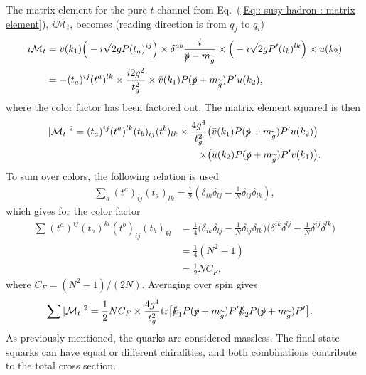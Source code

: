 \documentclass[twoside,english]{uiofysmaster}
\begin{document}
{The matrix element for the pure $t$-channel from Eq.~(\ref{Eq:: susy hadron : matrix element}), $i\mathcal{M}_t$, becomes (reading direction is from $q_j$ to $q_i$)
\begin{align*}
i \mathcal{M}_t &= \bar{v} (k_1) \Big( -i \sqrt{2} g P (t_a)^{ij}\Big) \times \delta^{ab} \frac{i}{\slashed{p} - m_{\widetilde{g}}} \times \Big( -i \sqrt{2} gP'(t_b)^{lk} \Big) \times u(k_2)\\
&= - (t_a)^{ij}(t^a)^{lk} \times \frac{i 2 g^2}{t_g^2} \times  \bar{v} (k_1)  P (\slashed{p} + m_{\widetilde{g}}) P' u(k_2) ,
\end{align*}
where the color factor has been factored out. The matrix element squared is then
\begin{align*}
|\mathcal{M}_t|^2 =  (t_a)^{ij} (t^a)^{lk} (t_b)_{ij} (t^b)_{lk} \times \frac{4 g^4}{t_g^2}&
\big( \bar{v} (k_1)  P (\slashed{p} + m_{\widetilde{g}}) P' u(k_2) \big)
\\ \times &\big( \bar{u} (k_2)  P (\slashed{p} + m_{\widetilde{g}}) P' v(k_1) \big).
\end{align*}
To sum over colors, the following relation is used \cite{ellis2003qcd}
\begin{align}\label{Eq:: susy hadron : color factor identity}
\sum_a (t^a)_{ij} (t_a)_{lk} = \frac{1}{2} (\delta_{ik} \delta_{lj} - \frac{1}{N} \delta_{ij} \delta_{lk}),
\end{align}
which gives for the color factor
\begin{align*}
\sum (t^a)^{ij}(t_a)^{kl}(t^b)_{ij}(t_b)_{kl} &= \frac{1}{4} 
\big(\delta_{ik} \delta_{lj} - \frac{1}{N} \delta_{ij} \delta_{lk} \big)
\big(\delta^{ik} \delta^{lj} - \frac{1}{N} \delta^{ij} \delta^{lk} \big)\\& = \frac{1}{4} (N^2 - 1)\\& = \frac{1}{2}NC_F,
\end{align*}
where $C_F = (N^2 - 1)/(2N)$. Averaging over spin gives
\begin{align*}
\sum |\mathcal{M}_t|^2 &= \frac{1}{2} NC_F \times \frac{4 g^4}{t_g^2} \text{tr} \big[ 
\slashed{k}_1 P (\slashed{p} + m_{\widetilde{g}}) P' \slashed{k}_2 P (\slashed{p} + m_{\widetilde{g}}) P' \big].
\end{align*}
As previously mentioned, the quarks are considered massless. The final state squarks can have equal or different chiralities, and both combinations contribute to the total cross section. 

}
\end{document}

